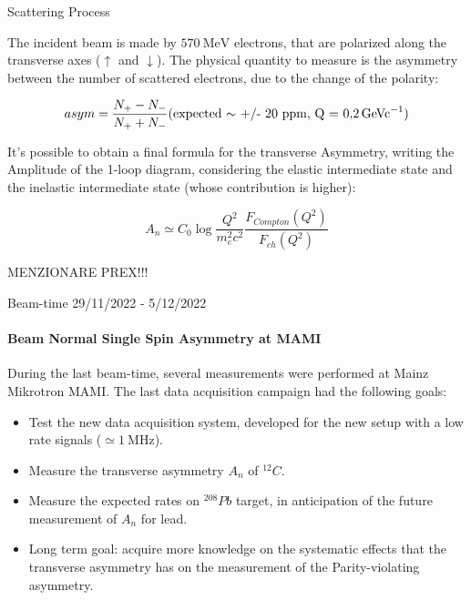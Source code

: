\documentclass[9pt,a4paper]{beamer}
\begin{document}
\begin{frame}{Scattering Process}

The incident beam is made by $\SI{570}{\mega \electronvolt}$ electrons, that are polarized along the transverse axes ($\uparrow$ and $\downarrow$). The physical quantity to measure is the asymmetry between the number of scattered electrons, due to the change of the polarity:

\begin{equation}
asym = \frac{N_{+} - N_{-}}{N_{+} + N_{-}} \text{(expected $\sim$ +/- 20 ppm, Q = \SI{0.2}{\giga\electronvolt c^{-1}})}
\end{equation}

It's possible to obtain a final formula for the transverse Asymmetry, writing the Amplitude of the 1-loop diagram, considering the elastic intermediate state and the inelastic intermediate state (whose contribution is higher):

\begin{equation}
A_{n} \simeq C_{0} \log \frac{Q^{2}}{m^2_e c^2} \frac{F_{Compton} (Q^2)}{F_{ch}(Q^2)}
\end{equation}

MENZIONARE PREX!!!

\end{frame}


\begin{frame}{Beam-time 29/11/2022 - 5/12/2022}
\framesubtitle{Beam Normal Single Spin Asymmetry at MAMI}
During the last beam-time, several measurements were performed at Mainz Mikrotron MAMI. The last data acquisition campaign had the following goals:

\begin{itemize}
\item Test the new data acquisition system, developed for the new setup with a low rate signals ($\simeq \SI{1}{\mega \hertz} $). 
\item Measure the transverse asymmetry $A_{n}$ of $^{12}C$.
\item Measure the expected rates on $^{208}Pb$ target, in anticipation of the future measurement of $A_{n}$ for lead. 
\item Long term goal: acquire more knowledge on the systematic effects that the transverse asymmetry has on the measurement of the Parity-violating asymmetry.
\end{itemize}
\end{frame}
\end{document}

